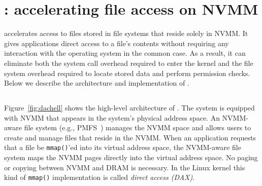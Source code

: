 \section{\DAChell{}: accelerating file access on NVMM}
\label{sec:system-quill}


\DAChell{} accelerates access to files stored in file systems that reside solely
in NVMM.  It gives applications direct access to a file's contents without
requiring any interaction with the operating system in the common case.  As a
result, it can eliminate both the system call overhead required to enter the
kernel and the file system overhead required to locate stored data and perform
permission checks.  Below we describe the architecture and implementation of
\DAChell{}.

\subsection{\DAChell{}}


Figure~\ref{fig:dachell} shows the high-level architecture of
\DAChell{}.  The system is equipped with NVMM that appears in the system's
physical address space.  An NVMM-aware file system (e.g.,
PMFS~\cite{PMFS}) manages the NVMM space and allows users to create and manage
files that reside in the NVMM.  When an application requests that a file be
\texttt{mmap()}'ed into its virtual address space, the NVMM-aware file system maps the
NVMM pages directly into the virtual address space.  No paging or copying
between NVMM and DRAM is necessary.  In the Linux kernel this kind of \texttt{mmap()}
implementation is called \emph{direct access (DAX)}.

